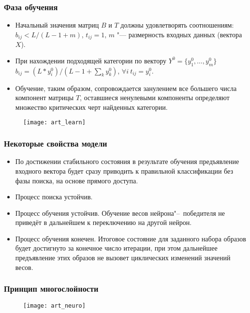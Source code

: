 \documentclass[default]{beamer}
\begin{document}
	\begin{frame}
		\frametitle{Фаза обучения}
		
		\begin{itemize}
			\item Начальный значения матриц $B$ и $T$ должны удовлетворять соотношениям: $b_{ij}<L/(L-1+m)$, $t_{ij}=1$, $m$ "--- размерность входных данных (вектора $X$).
			\item При нахождении подходящей категории по вектору $Y^0=\{y_1^0,\dots,y_m^0\}$ $b_{ij}=(L*y_i^0)/(L-1+\sum_k y_k^0)$, $\forall i\ t_{ij}=y_i^0$.
			\item Обучение, таким образом, сопровождается занулением все большего числа компонент матрицы $T$, оставшиеся ненулевыми компоненты определяют множество критических черт найденных категории.
		\end{itemize}
		\begin{figure}
			\texttt{[image: art\_learn]}
		\end{figure}
	\end{frame}

	\begin{frame}
		\frametitle{Некоторые свойства модели}
		
		\begin{itemize}
			\item По достижении стабильного состояния в результате обучения предъявление входного вектора будет сразу приводить к правильной классификации без фазы поиска, на основе прямого доступа.
			\item Процесс поиска устойчив.
			\item Процесс обучения устойчив. Обучение весов нейрона"--~победителя не приведёт в дальнейшем к переключению на другой нейрон.
			\item Процесс обучения конечен. Итоговое состояние для заданного набора образов будет достигнуто за конечное число итерации, при этом дальнейшее предъявление этих образов не вызовет циклических изменений значений весов.
		\end{itemize}
	\end{frame}
	
	\begin{frame}
		\frametitle{Принцип многослойности}
		
		\begin{figure}
			\texttt{[image: art\_neuro]}
		\end{figure}
	\end{frame}
			
\end{document}

